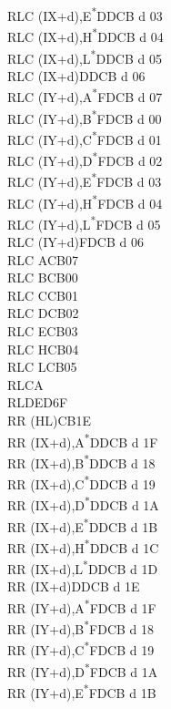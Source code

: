 \documentclass[twoside,openright,a4paper]{book}
\begin{document}
\begin{multicols}{3}
{\begin{tabbing}
	RLC (IX+d),E\textsuperscript{*}\>DDCB d 03\\
	RLC (IX+d),H\textsuperscript{*}\>DDCB d 04\\
	RLC (IX+d),L\textsuperscript{*}\>DDCB d 05\\
	RLC (IX+d)\>DDCB d 06\\
	RLC (IY+d),A\textsuperscript{*}\>FDCB d 07\\
	RLC (IY+d),B\textsuperscript{*}\>FDCB d 00\\
	RLC (IY+d),C\textsuperscript{*}\>FDCB d 01\\
	RLC (IY+d),D\textsuperscript{*}\>FDCB d 02\\
	RLC (IY+d),E\textsuperscript{*}\>FDCB d 03\\
	RLC (IY+d),H\textsuperscript{*}\>FDCB d 04\\
	RLC (IY+d),L\textsuperscript{*}\>FDCB d 05\\
	RLC (IY+d)\>FDCB d 06\\
	RLC A\>CB07\\
	RLC B\>CB00\\
	RLC C\>CB01\\
	RLC D\>CB02\\
	RLC E\>CB03\\
	RLC H\>CB04\\
	RLC L\>CB05\\
	RLCA\\
	RLD\>ED6F\\
	RR (HL)\>CB1E\\
	RR (IX+d),A\textsuperscript{*}\>DDCB d 1F\\
	RR (IX+d),B\textsuperscript{*}\>DDCB d 18\\
	RR (IX+d),C\textsuperscript{*}\>DDCB d 19\\
	RR (IX+d),D\textsuperscript{*}\>DDCB d 1A\\
	RR (IX+d),E\textsuperscript{*}\>DDCB d 1B\\
	RR (IX+d),H\textsuperscript{*}\>DDCB d 1C\\
	RR (IX+d),L\textsuperscript{*}\>DDCB d 1D\\
	RR (IX+d)\>DDCB d 1E\\
	RR (IY+d),A\textsuperscript{*}\>FDCB d 1F\\
	RR (IY+d),B\textsuperscript{*}\>FDCB d 18\\
	RR (IY+d),C\textsuperscript{*}\>FDCB d 19\\
	RR (IY+d),D\textsuperscript{*}\>FDCB d 1A\\
	RR (IY+d),E\textsuperscript{*}\>FDCB d 1B\\

\end{tabbing}}
\end{multicols}
\end{document}
